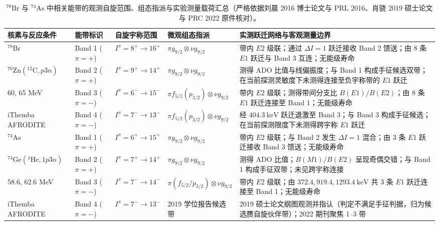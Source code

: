 \begin{table}[!htbp]
\centering
\small
\caption{$^{78}\mathrm{Br}$ 与 $^{74}\mathrm{As}$ 中相关能带的观测自旋范围、组态指派与实验测量载荷汇总（严格依据刘晨 2016 博士论文与 PRL 2016、肖骁 2019 硕士论文与 PRC 2022 原件核对）。}\label{tab:4-5-bands-summary}
\begin{tabularx}{\textwidth}{llp{2.6cm}p{3.2cm}X}
\hline\hline
核素与反应条件 & 能带标识 & 自旋宇称范围 & 微观组态指派 & 实测跃迁网络与客观测量边界 \\
\hline
$^{78}\mathrm{Br}$ & Band 1 ($\pi=+$) & $I^\pi = 8^+ \to 16^+$ & $\pi g_{9/2} \otimes \nu g_{9/2}$ & 带内 $E2$ 级联；通过 $\Delta I=1$ 跃迁接收 Band 2 馈送；由 8 条 $E1$ 跃迁与 Band 3 互连；无能级寿命 \\
$^{70}\mathrm{Zn}(^{12}\mathrm{C}, p3n)$ & Band 2 ($\pi=+$) & $I^\pi = 9^+ \to 14^+$ & $\pi g_{9/2} \otimes \nu g_{9/2}$ & 测得 ADO 比值与线偏振度；与 Band 1 构成手征候选双带；在当前探测灵敏度下未测得连接至负宇称带的 $E1$ 跃迁 \\
60, 65 MeV & Band 3 ($\pi=-$) & $I^\pi = 6^- \to 15^-$ & $\pi f_{5/2}(p_{3/2}) \otimes \nu g_{9/2}$ & 带内 $E2$ 级联；测得带间分支比 $B(E1)/B(E2)$；由 8 条 $E1$ 跃迁连接至 Band 1；无能级寿命 \\
iThemba AFRODITE & Band 4 ($\pi=-$) & $I^\pi = 7^- \to 13^-$ & $\pi f_{5/2}(p_{3/2}) \otimes \nu g_{9/2}$ & 经 $404.3\ \mathrm{keV}$ 跃迁退激至 Band 3；与 Band 3 构成手征候选；在当前探测限度下未测得跨宇称 $E1$ 跃迁 \\
\hline
$^{74}\mathrm{As}$ & Band 1 ($\pi=+$) & $I^\pi = 6^+ \to 15^+$ & $\pi g_{9/2} \otimes \nu g_{9/2}$ & 带内 $E2$ 级联；与 Band 2 发生 $\Delta I=1$ 混合；由 3 条 $E1$ 跃迁接收 Band 3 馈送；无能级寿命 \\
$^{74}\mathrm{Ge}(^4\mathrm{He}, 1p3n)$ & Band 2 ($\pi=+$) & $I^\pi = 7^+ \to 14^+$ & $\pi g_{9/2} \otimes \nu g_{9/2}$ & 测得 ADO 比值；$B(M1)/B(E2)$ 呈现奇偶交错；与 Band 1 构成手征双带；未见跨宇称连接 \\
58.6, 62.6 MeV & Band 3 ($\pi=-$) & $I^\pi = 7^- \to 14^-$ & $\pi(f_{5/2}/p_{3/2}) \otimes \nu g_{9/2}$ & 带内 $E2$ 级联；由 $372.4, 919.4, 1293.4\ \mathrm{keV}$ 共 3 条 $E1$ 跃迁连接至 Band 1；无能级寿命 \\
iThemba AFRODITE & Band 4 ($\pi=-$) & $I^\pi = 7^- \to 13^-$ & 2019 学位报告候选带 & 2019 硕士论文纲图观测并指认（判定不满足手征判据，归为候选赝自旋伙伴带）；2022 期刊聚焦 1--3 带 \\
\hline\hline
\end{tabularx}
\end{table}

